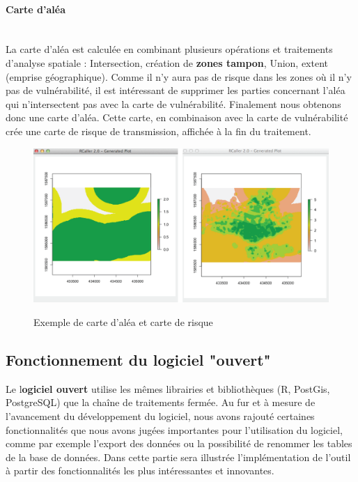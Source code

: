 \paragraph{Carte d'aléa\\\\}

La carte d'aléa est calculée en combinant plusieurs opérations et traitements d'analyse spatiale : Intersection, création de \textbf{zones tampon}, Union, extent (emprise géographique). Comme il n'y aura pas de risque dans les zones où il n'y pas de vulnérabilité, il est intéressant de supprimer les parties concernant l'aléa qui n'intersectent pas avec la carte de vulnérabilité. Finalement nous obtenons donc une carte d'aléa. Cette carte, en combinaison avec la carte de vulnérabilité crée une carte de risque de transmission, affichée à la fin du traitement.

\begin{figure}[H]
\begin{center}
\includegraphics[width=13cm]{Chaine12}\\
\caption{\label{Chaine12}Exemple de carte d'aléa et carte de risque}

\end{center}
\end{figure}

\newpage


\subsection{Fonctionnement du logiciel "ouvert"}

Le l\textbf{ogiciel ouvert} utilise les mêmes librairies et bibliothèques (R, PostGis, PostgreSQL) que la chaîne de traitements fermée. Au fur et à mesure de l'avancement du développement du logiciel, nous avons rajouté certaines fonctionnalités que nous avons jugées importantes pour l'utilisation du logiciel, comme par exemple l'export des données ou la possibilité de renommer les tables de la base de données. Dans cette partie sera illustrée l'implémentation de l'outil à partir des fonctionnalités les plus intéressantes et innovantes.


